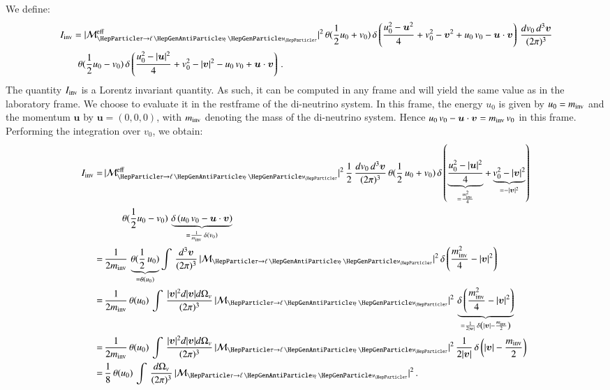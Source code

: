 We define:
\begin{align}
& \, I_{\inv} = \vert\mathcal{M}^{\eff}_{\Pgt \to
  \ellnunu}\vert^{2} \, \theta(\frac{1}{2} u_{0} + v_{0}) \, \delta
\left( \frac{u_{0}^{2} - \bm{u}^{2}}{4} + v_{0}^{2} - \bm{v}^{2} +
  u_{0} \, v_{0} - \bm{u} \cdot \bm{v} \right) \, 
  \frac{dv_{0} \, d^{3}\bm{v}}{(2\pi)^{3}} \nonumber \\
 & \qquad
  \theta(\frac{1}{2} u_{0}
  - v_{0}) \, \delta \left( \frac{u_{0}^{2} - \vert\bm{u}\vert^{2}}{4} +
    v_{0}^{2} - \vert\bm{v}\vert^{2} - u_{0} \, v_{0} + \bm{u}
    \cdot \bm{v} \right) \, .
\label{eq:def_Iinv}
\end{align}
The quantity $I_{\textrm{inv}}$ is a Lorentz invariant quantity. 
As such, it can be computed in any frame and will yield the same value as in the laboratory frame.
We choose to evaluate it in the restframe of the di-neutrino system.
In this frame, the energy $u_{0}$ is given by $u_{0} = m_{\textrm{inv}}$ 
and the momentum $\bm{u}$ by $\bm{u} = ( 0, 0, 0 )$, with $m_{\textrm{inv}}$ denoting
the mass of the di-neutrino system.
Hence $u_{0} \, v_{0} - \bm{u} \cdot \bm{v} = m_{\textrm{inv}} \, v_{0} $ in this frame.
Performing the integration over $v_{0}$, we obtain:
\begin{align}
I_{\inv}
= & \, \vert\mathcal{M}^{\eff}_{\Pgt \to
  \ellnunu}\vert^{2} \, \frac{1}{2} \, \frac{dv_{0} \, d^{3}\bm{v}}{(2\pi)^{3}} \, \theta ( \frac{1}{2} \, u_{0} + v_{0} ) \, 
    \delta \left( \underbrace{\frac{u_{0}^{2} - \vert\bm{u}\vert^{2}}{4}}_{=
        \frac{m^{2}_{\inv}}{4}} + \underbrace{v_{0}^{2} -
        \vert\bm{v}\vert^{2}}_{= -\vert\bm{v}\vert^{2}} \right)
    \nonumber \\
& \qquad
    \theta ( \frac{1}{2} u_{0} - v_{0} ) \, \underbrace{\delta \left(
        u_{0} \, v_{0} - \bm{u} \cdot \bm{v} \right)}_{= \frac{1}{m_{\inv}} \, \delta ( v_{0} )} \nonumber \\
= & \, \frac{1}{2 m_{\inv}} \, \underbrace{\theta ( \frac{1}{2} \, u_{0} )}_{= \theta ( u_{0} )} \int \, \frac{d^{3}\bm{v}}{(2\pi)^{3}} \, 
  \vert\mathcal{M}_{\Pgt \to
  \ellnunu}\vert^{2} \, \delta \left( \frac{m^{2}_{\inv}}{4} - \vert\bm{v}\vert^{2} \right) \nonumber \\
= & \, \frac{1}{2 m_{\inv}} \, \theta ( u_{0} ) \, \int \, \frac{\vert\bm{v}\vert^2 d\vert\bm{v}\vert d\Omega_{v}}{(2\pi)^{3}} \, 
  \vert\mathcal{M}_{\Pgt \to
  \ellnunu}\vert^{2} \, \underbrace{\delta \left( \frac{m^{2}_{\inv}}{4} - \vert\bm{v}\vert^{2} \right)}_{
    = \frac{1}{2 \vert\bm{v}\vert} \, \delta \left( \vert\bm{v}\vert - \frac{m_{\inv}}{2} \right)} \nonumber \\
= & \, \frac{1}{2 m_{\inv}} \, \theta ( u_{0} ) \, \int \, \frac{\vert\bm{v}\vert^2 d\vert\bm{v}\vert d\Omega_{v}}{(2\pi)^{3}} \, 
  \vert\mathcal{M}_{\Pgt \to
  \ellnunu}\vert^{2} \, \frac{1}{2 \vert\bm{v}\vert} \, \delta \left( \vert\bm{v}\vert - \frac{m_{\inv}}{2} \right) \nonumber \\
= & \, \frac{1}{8} \, \theta ( u_{0} ) \, \int \, \frac{d\Omega_{v}}{(2\pi)^{3}} \, \vert\mathcal{M}_{\Pgt \to
  \ellnunu}\vert^{2} \, . 
\label{eq:lepTauDecaysI}
\end{align}


